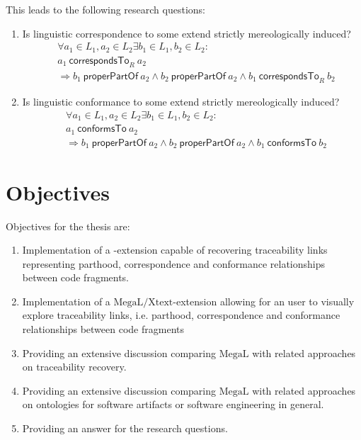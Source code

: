 \documentclass[runningheads,a4paper]{llncs}
\newcommand{\properPartOf}{~\textsf{properPartOf}~}
\newcommand{\correspondsToR}[1]{~\textsf{correspondsTo}_{#1}~}
\newcommand{\conformsTo}{~\textsf{conformsTo}~}
\newcommand{\megal}{\text{MegaL}}
\newcommand{\megalxtext}{\text{MegaL/Xtext}}
\begin{document}
This leads to the following research questions:
\begin{enumerate}[RQ1]

\item
Is linguistic correspondence to some extend strictly mereologically induced?
\begin{align*}
&\forall a_1 \in L_1, a_2 \in L_2 \exists b_1 \in L_1, b_2 \in L_2 :
\\&a_1 \correspondsToR{R} a_2
\\&\Rightarrow 
b_1 \properPartOf a_2 
\wedge b_2 \properPartOf a_2 
\wedge b_1 \correspondsToR{R} b_2
\end{align*}

\item
Is linguistic conformance to some extend strictly mereologically induced?
\begin{align*}
&\forall a_1 \in L_1, a_2 \in L_2 \exists b_1 \in L_1, b_2 \in L_2 :
\\&a_1 \conformsTo a_2
\\&\Rightarrow 
b_1 \properPartOf a_2 
\wedge b_2 \properPartOf a_2 
\wedge b_1 \conformsTo b_2
\end{align*}

\end{enumerate}

\section{Objectives}
\label{section:Objectives}
Objectives for the thesis are:
\begin{enumerate}[O1]
\item
Implementation of a \megalxtext-extension capable of recovering traceability links representing parthood, correspondence and conformance relationships between code fragments.

\item
Implementation of a $\megalxtext$-extension allowing for an user to visually explore traceability links, i.e. parthood, correspondence and conformance relationships between code fragments

\item
Providing an extensive discussion comparing $\megal$ with related approaches on traceability recovery.

\item
Providing an extensive discussion comparing $\megal$ with related approaches on ontologies for software artifacts or software engineering in general.

\item
Providing an answer for the research questions.

\end{enumerate}
\end{document}
